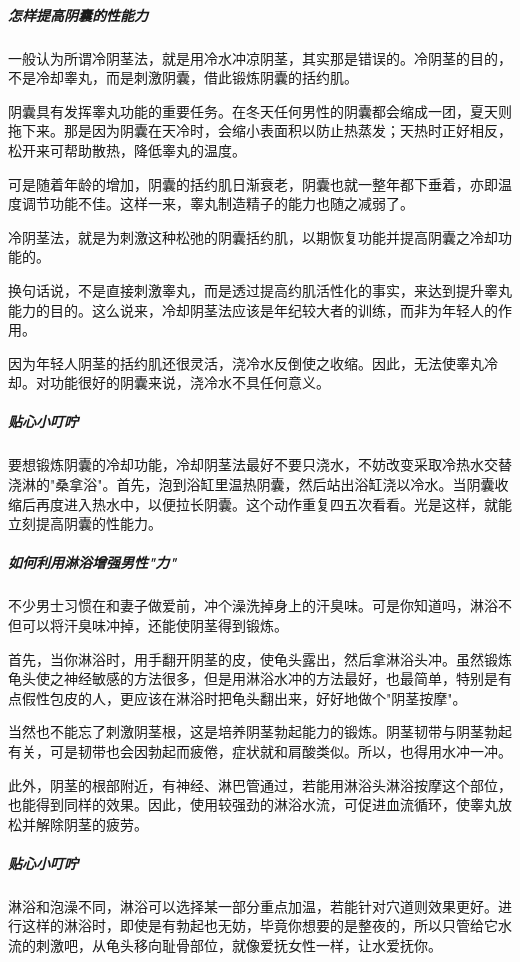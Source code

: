 \begin{enumerate}
\subparagraph{怎样提高阴囊的性能力}

一般认为所谓冷阴茎法，就是用冷水冲凉阴茎，其实那是错误的。冷阴茎的目的，不是冷却睾丸，而是刺激阴囊，借此锻炼阴囊的括约肌。

阴囊具有发挥睾丸功能的重要任务。在冬天任何男性的阴囊都会缩成一团，夏天则拖下来。那是因为阴囊在天冷时，会缩小表面积以防止热蒸发；天热时正好相反，松开来可帮助散热，降低睾丸的温度。

可是随着年龄的增加，阴囊的括约肌日渐衰老，阴囊也就一整年都下垂着，亦即温度调节功能不佳。这样一来，睾丸制造精子的能力也随之减弱了。

冷阴茎法，就是为刺激这种松弛的阴囊括约肌，以期恢复功能并提高阴囊之冷却功能的。

换句话说，不是直接刺激睾丸，而是透过提高约肌活性化的事实，来达到提升睾丸能力的目的。这么说来，冷却阴茎法应该是年纪较大者的训练，而非为年轻人的作用。

因为年轻人阴茎的括约肌还很灵活，浇冷水反倒使之收缩。因此，无法使睾丸冷却。对功能很好的阴囊来说，浇冷水不具任何意义。

\subparagraph{贴心小叮咛}

要想锻炼阴囊的冷却功能，冷却阴茎法最好不要只浇水，不妨改变采取冷热水交替浇淋的"桑拿浴"。首先，泡到浴缸里温热阴囊，然后站出浴缸浇以冷水。当阴囊收缩后再度进入热水中，以便拉长阴囊。这个动作重复四五次看看。光是这样，就能立刻提高阴囊的性能力。

\subparagraph{如何利用淋浴增强男性"力"}

不少男士习惯在和妻子做爱前，冲个澡洗掉身上的汗臭味。可是你知道吗，淋浴不但可以将汗臭味冲掉，还能使阴茎得到锻炼。

首先，当你淋浴时，用手翻开阴茎的皮，使龟头露出，然后拿淋浴头冲。虽然锻炼龟头使之神经敏感的方法很多，但是用淋浴水冲的方法最好，也最简单，特别是有点假性包皮的人，更应该在淋浴时把龟头翻出来，好好地做个"阴茎按摩"。

当然也不能忘了刺激阴茎根，这是培养阴茎勃起能力的锻炼。阴茎韧带与阴茎勃起有关，可是韧带也会因勃起而疲倦，症状就和肩酸类似。所以，也得用水冲一冲。

此外，阴茎的根部附近，有神经、淋巴管通过，若能用淋浴头淋浴按摩这个部位，也能得到同样的效果。因此，使用较强劲的淋浴水流，可促进血流循环，使睾丸放松并解除阴茎的疲劳。

\subparagraph{贴心小叮咛}

淋浴和泡澡不同，淋浴可以选择某一部分重点加温，若能针对穴道则效果更好。进行这样的淋浴时，即使是有勃起也无妨，毕竟你想要的是整夜的，所以只管给它水流的刺激吧，从龟头移向耻骨部位，就像爱抚女性一样，让水爱抚你。


\end{enumerate}
